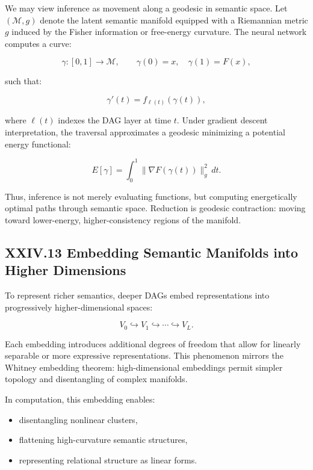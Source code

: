 \documentclass[12pt,letterpaper]{article}
\begin{document}
We may view inference as movement along a geodesic in semantic space. Let $(\mathcal{M}, g)$ denote the latent semantic manifold equipped with a Riemannian metric $g$ induced by the Fisher information or free-energy curvature. The neural network computes a curve:

\[
\gamma : [0,1] \to \mathcal{M}, \qquad \gamma(0) = x, \quad \gamma(1) = F(x),
\]

such that:

\[
\gamma'(t) = f_{\ell(t)}(\gamma(t)),
\]

where $\ell(t)$ indexes the DAG layer at time $t$. Under gradient descent interpretation, the traversal approximates a geodesic minimizing a potential energy functional:

\[
E[\gamma] = \int_0^1 \|\nabla F(\gamma(t))\|_g^2 \, dt.
\]

Thus, inference is not merely evaluating functions, but computing energetically optimal paths through semantic space.  
Reduction is geodesic contraction: moving toward lower-energy, higher-consistency regions of the manifold.

\subsection{XXIV.13 Embedding Semantic Manifolds into Higher Dimensions}

To represent richer semantics, deeper DAGs embed representations into progressively higher-dimensional spaces:

\[
V_0 \hookrightarrow V_1 \hookrightarrow \cdots \hookrightarrow V_L.
\]

Each embedding introduces additional degrees of freedom that allow for linearly separable or more expressive representations. This phenomenon mirrors the Whitney embedding theorem: high-dimensional embeddings permit simpler topology and disentangling of complex manifolds.

In computation, this embedding enables:

\begin{itemize}
    \item disentangling nonlinear clusters,
    \item flattening high-curvature semantic structures,
    \item representing relational structure as linear forms.
\end{itemize}
\end{document}

